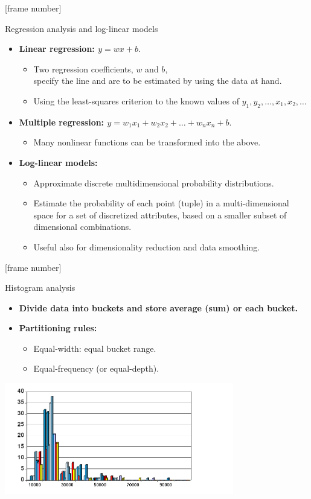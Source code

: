 \documentclass[aspectratio=169,t]{beamer}
\begin{document}
  {
    [frame number]
    \begin{frame}{Regression analysis and log-linear models}
    \begin{itemize}
      \item \textbf{Linear regression: $y = wx + b$}.
      \begin{itemize}
        \item Two regression coefficients, $w$ and $b$, \\
              specify the line and are to be estimated by using the data at hand.
        \item Using the least-squares criterion to the known values of $y_1,y_2, \ldots, x_1,x_2,\ldots$
      \end{itemize}
      \item \textbf{Multiple regression: $y = w_1 x_1 + w_2 x_2 + \ldots + w_n x_n + b$}.
      \begin{itemize}
        \item Many nonlinear functions can be transformed into the above.
      \end{itemize}
      \item \textbf{Log-linear models:}
      \begin{itemize}
        \item Approximate discrete multidimensional probability distributions.
        \item Estimate the probability of each point (tuple) in a multi-dimensional space for a set of discretized attributes, based on a smaller subset of dimensional combinations.
        \item Useful also for dimensionality reduction and data smoothing.
      \end{itemize}
    \end{itemize}
    \end{frame}
  }

  {
    [frame number]
    \begin{frame}{Histogram analysis}
    \begin{itemize}
      \item \textbf{Divide data into buckets and store average (sum) or each bucket.}
      \item \textbf{Partitioning rules:}
      \begin{itemize}
        \item Equal-width: equal bucket range.
        \item Equal-frequency (or equal-depth).
      \end{itemize}
    \end{itemize}
    \includegraphics[width=10cm]{img/histogram.png}
    \end{frame}
  }
\end{document}
